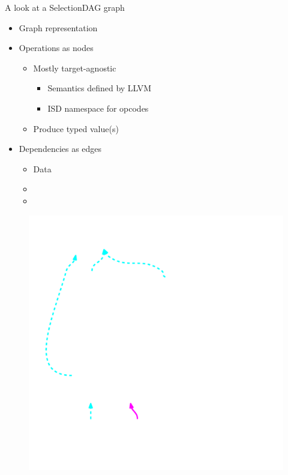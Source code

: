 \begin{frame}{A look at a SelectionDAG graph}

\begin{minipage}[t]{0.50\linewidth}
    \begin{itemize}
        \item Graph representation
        \item Operations as nodes
        \begin{itemize}
            \item Mostly target-agnostic
            \begin{itemize}
                \item Semantics defined by LLVM
                \item ISD namespace for opcodes
            \end{itemize}
            \item Produce typed value(s)
        \end{itemize}
        \item Dependencies as edges
        \begin{itemize}
            \item Data
            \item {}
            \item {}
        \end{itemize}
    \end{itemize}
\end{minipage}
\begin{minipage}[t]{0.49\linewidth}
    \begin{figure}
        \vspace{-2.2ex}
        \includegraphics[width = 1.0\textwidth]{examples/ex1b/ex1b-pre-isel.pdf}
    \end{figure}
\end{minipage}


\end{frame}
